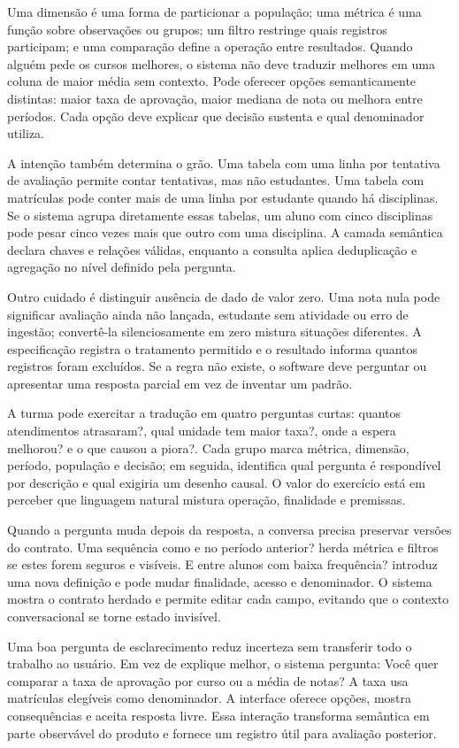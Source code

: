 Uma dimensão é uma forma de particionar a população; uma métrica é uma função sobre observações ou grupos; um filtro restringe quais registros participam; e uma comparação define a operação entre resultados. Quando alguém pede os cursos melhores, o sistema não deve traduzir melhores em uma coluna de maior média sem contexto. Pode oferecer opções semanticamente distintas: maior taxa de aprovação, maior mediana de nota ou melhora entre períodos. Cada opção deve explicar que decisão sustenta e qual denominador utiliza.

A intenção também determina o grão. Uma tabela com uma linha por tentativa de avaliação permite contar tentativas, mas não estudantes. Uma tabela com matrículas pode conter mais de uma linha por estudante quando há disciplinas. Se o sistema agrupa diretamente essas tabelas, um aluno com cinco disciplinas pode pesar cinco vezes mais que outro com uma disciplina. A camada semântica declara chaves e relações válidas, enquanto a consulta aplica deduplicação e agregação no nível definido pela pergunta.

Outro cuidado é distinguir ausência de dado de valor zero. Uma nota nula pode significar avaliação ainda não lançada, estudante sem atividade ou erro de ingestão; convertê-la silenciosamente em zero mistura situações diferentes. A especificação registra o tratamento permitido e o resultado informa quantos registros foram excluídos. Se a regra não existe, o software deve perguntar ou apresentar uma resposta parcial em vez de inventar um padrão.

A turma pode exercitar a tradução em quatro perguntas curtas: quantos atendimentos atrasaram?, qual unidade tem maior taxa?, onde a espera melhorou? e o que causou a piora?. Cada grupo marca métrica, dimensão, período, população e decisão; em seguida, identifica qual pergunta é respondível por descrição e qual exigiria um desenho causal. O valor do exercício está em perceber que linguagem natural mistura operação, finalidade e premissas.

Quando a pergunta muda depois da resposta, a conversa precisa preservar versões do contrato. Uma sequência como e no período anterior? herda métrica e filtros se estes forem seguros e visíveis. E entre alunos com baixa frequência? introduz uma nova definição e pode mudar finalidade, acesso e denominador. O sistema mostra o contrato herdado e permite editar cada campo, evitando que o contexto conversacional se torne estado invisível.

Uma boa pergunta de esclarecimento reduz incerteza sem transferir todo o trabalho ao usuário. Em vez de explique melhor, o sistema pergunta: Você quer comparar a taxa de aprovação por curso ou a média de notas? A taxa usa matrículas elegíveis como denominador. A interface oferece opções, mostra consequências e aceita resposta livre. Essa interação transforma semântica em parte observável do produto e fornece um registro útil para avaliação posterior.

